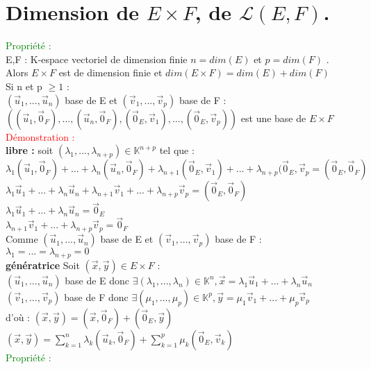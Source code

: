 \documentclass{article}
\begin{document}
\section{Dimension de $E \times F$, de $\mathcal L(E,F)$.}
\textcolor{green}{Propriété :} \\
E,F : K-espace vectoriel de dimension finie $n=dim(E)$ et $p=dim(F)$ . \\
Alors $E \times F$ est de dimension finie et $dim(E \times F)=dim(E) +dim(F)$ \\
Si n et p $\geq 1$ : \\
$(\vec u_1,..., \vec u_n)$ base de E et $(\vec v_1, ...,\vec v_p)$ base de F : \\
$((\vec u_1,\vec 0_F),...,(\vec u_n, \vec 0_F),(\vec 0_E, \vec v_1),...,(\vec 0_E, \vec v_p))$ est une base de $E \times F$ \\
\textcolor{red}{Démonstration :} \\
{\bf libre :} soit $(\lambda_1,...,\lambda_{n+p}) \in \mathbb K^{n+p}$ tel que : \\
$\lambda_1 (\vec u_1, \vec 0_F)+...+ \lambda_n (\vec u_n, \vec 0_F)+ \lambda_{n+1} (\vec 0_E, \vec v_1)+...+ \lambda_{n+p}(\vec 0_E, \vec v_p =(\vec 0_E, \vec 0_F)$ \\
$\lambda_1 \vec u_1+...+ \lambda_n \vec u_n + \lambda_{n+1}  \vec v_1 +...+ \lambda_{n+p} \vec v_p =(\vec 0_E, \vec 0_F)$ \\
$\lambda_1 \vec u_1+...+ \lambda_n \vec u_n =\vec 0_E$ \\
$\lambda_{n+1}  \vec v_1 +...+ \lambda_{n+p} \vec v_p =\vec 0_F$ \\
Comme $(\vec u_1,..., \vec u_n)$ base de E et $(\vec v_1,...,\vec v_p)$ base de F : \\
$\lambda_1=...=\lambda_{n+p}=0$ \\
{\bf génératrice} Soit $(\vec x, \vec y) \in E \times F$ : \\
$(\vec u_1,..., \vec u_n)$ base de E donc $\exists (\lambda_1,..., \lambda_n) \in \mathbb K^n, \vec x =\lambda_1 \vec u_1+...+ \lambda_n \vec u_n$ \\
$(\vec v_1,..., \vec v_p)$ base de F donc $\exists (\mu_1,..., \mu_p) \in \mathbb K^p, \vec y =\mu_1 \vec v_1+...+ \mu_p \vec v_p$ \\
d'où : $(\vec x, \vec y)= (\vec x, \vec 0_F)+ (\vec 0_E, \vec y)$ \\
$(\vec x, \vec y)=\sum_{k=1}^n \lambda_k (\vec u_k, \vec 0_F)+ \sum_{k=1}^p \mu_k (\vec 0_E, \vec v_k)$ \\
\textcolor{green}{Propriété :} \\
\end{document}
